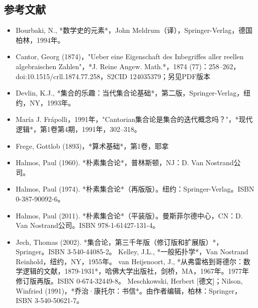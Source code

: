\subsection{参考文献}   
\begin{itemize}
\item Bourbaki, N., *数学史的元素*，John Meldrum（译），Springer-Verlag，德国柏林，1994年。  
\item Cantor, Georg (1874)，"Ueber eine Eigenschaft des Inbegriffes aller reellen algebraischen Zahlen"，*J. Reine Angew. Math.*，1874 (77)：258–262，doi:10.1515/crll.1874.77.258，S2CID 124035379；另见PDF版本  
\item Devlin, K.J., *集合的乐趣：当代集合论基础*，第二版，Springer-Verlag，纽约，NY，1993年。  
\item María J. Frápolli，1991年，"Cantorian集合论是集合的迭代概念吗？"，*现代逻辑*，第1卷第4期，1991年，302–318。
\item Frege, Gottlob (1893)，*算术基础*，第1卷，耶拿  
\item Halmos, Paul (1960). *朴素集合论*，普林斯顿，NJ：D. Van Nostrand公司。  
\item Halmos, Paul (1974). *朴素集合论*（再版版）。纽约：Springer-Verlag。ISBN 0-387-90092-6。  
\item Halmos, Paul (2011). *朴素集合论*（平装版）。曼斯菲尔德中心，CN：D. Van Nostrand公司。ISBN 978-1-61427-131-4。

\item Jech, Thomas (2002). *集合论，第三千年版（修订版和扩展版）*，Springer。ISBN 3-540-44085-2。  
Kelley, J.L., *一般拓扑学*，Van Nostrand Reinhold，纽约，NY，1955年。  
van Heijenoort, J., *从弗雷格到哥德尔：数学逻辑的文献，1879-1931*，哈佛大学出版社，剑桥，MA，1967年。1977年修订版再版。ISBN 0-674-32449-8。  
Meschkowski, Herbert [德文]；Nilson, Winfried (1991)，*乔治·康托尔：书信*。由作者编辑，柏林：Springer，ISBN 3-540-50621-7。
\end{itemize}
